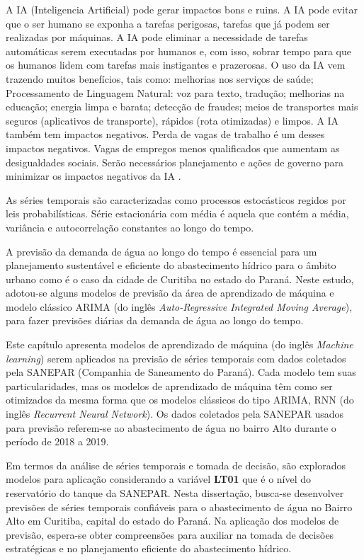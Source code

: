 A IA (Inteligencia Artificial) pode gerar impactos bons e ruins. A IA pode evitar que o ser humano se exponha a tarefas perigosas, tarefas que já podem ser realizadas por máquinas. A IA pode eliminar a necessidade de tarefas automáticas serem executadas por humanos e, com isso, sobrar tempo para que os humanos lidem com tarefas mais instigantes e prazerosas.
O uso da IA vem trazendo muitos benefícios, tais como: melhorias nos serviços de saúde; Processamento de Linguagem Natural: voz para texto, tradução; melhorias na educação; energia limpa e barata; detecção de fraudes; meios de transportes mais seguros (aplicativos de transporte), rápidos (rota otimizadas) e limpos.
A IA também tem impactos negativos. Perda de vagas de trabalho é um desses impactos negativos. Vagas de empregos menos qualificados que aumentam as desigualdades sociais. Serão necessários planejamento e ações de governo para minimizar os impactos negativos da IA \cite{Silva2021}.

As séries temporais são caracterizadas como processos estocásticos regidos por leis probabilísticas.
Série estacionária com média é aquela que contém a média, variância e autocorrelação constantes ao longo do tempo.



%

%

A previsão da demanda de água ao longo do tempo é essencial para um planejamento sustentável e eficiente do abastecimento hídrico para o âmbito urbano como é o caso da cidade de Curitiba no estado do Paraná. Neste estudo, adotou-se alguns modelos de previsão da área de aprendizado de máquina e modelo clássico ARIMA (do inglês \textit{Auto-Regressive Integrated Moving Average}), para fazer previsões diárias da demanda de água ao longo do tempo.


Este capítulo apresenta modelos de aprendizado de máquina (do inglês \textit{Machine learning}) serem aplicados na previsão de séries temporais com dados coletados pela SANEPAR (Companhia de Saneamento do Paraná). Cada modelo tem suas particularidades, mas os modelos de aprendizado de máquina têm como ser otimizados da mesma forma que os modelos clássicos do tipo ARIMA, RNN (do inglês \textit{Recurrent Neural Network}). Os dados coletados pela SANEPAR usados para previsão referem-se ao abastecimento de água no bairro Alto durante o período de 2018 a 2019.

Em termos da análise de séries temporais e tomada de decisão, são explorados modelos para aplicação considerando a variável \textbf{LT01} que é o nível do reservatório do tanque da SANEPAR.
Nesta dissertação, busca-se desenvolver previsões de séries temporais confiáveis para o abastecimento de água no Bairro Alto em Curitiba, capital do estado do Paraná. Na aplicação dos modelos de previsão, espera-se obter compreensões para auxiliar na tomada de decisões estratégicas e no planejamento eficiente do abastecimento hídrico.


          

   

    

    

    